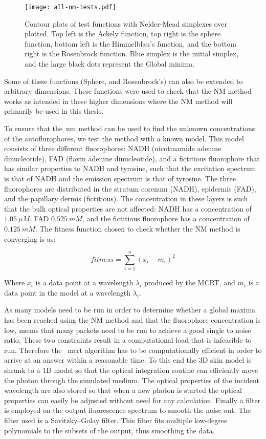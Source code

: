 \begin{figure}[!htbp]
    \centering
    \texttt{[image: all-nm-tests.pdf]}
    \caption{Contour plots of test functions with Nelder-Mead simplexes over plotted. Top left is the Ackely function, top right is the sphere function, bottom left is the Himmelblau's function, and the bottom right is the Rosenbrock function. Blue simplex is the initial simplex, and the large black dots represent the Global minima.}
    \label{fig:nmtest}
\end{figure}

Some of these functions (Sphere, and Rosenbrock's) can also be extended to arbitrary dimensions. These functions were used to check that the NM method works as intended in these higher dimensions where the NM method will primarily be used in this thesis.

To ensure that the~\gls*{nm} method can be used to find the unknown concentrations of the autoflurophores, we test the method with a known model.
This model consists of three different fluorophores: NADH (nicotinamide adenine dinucleotide), FAD (flavin adenine dinucleotide), and a fictitious fluorophore that has similar properties to NADH and tyrosine, such that the excitation spectrum is that of NADH and the emission spectrum is that of tyrosine.
The three fluorophores are distributed in the stratum corenum (NADH), epidermis (FAD), and the papillary dermis (fictitious).
The concentration in these layers is such that the bulk optical properties are not affected: NADH has a concentration of $1.05~\mu M$, FAD $0.525~m M$, and the fictitious fluorophore has a concentration of $0.125~mM$. %
The fitness function chosen to check whether the NM method is converging is as:

\begin{equation}
fitness = \sum\limits_{i=1}^{n}(x_i-m_i)^2
\end{equation}

Where $x_i$ is a data point at a wavelength $\lambda_i$ produced by the MCRT, and $m_i$ is a data point in the model at a wavelength $\lambda_i$.

As many models need to be run in order to determine whether a global maxima has been reached using the NM method and that the fluorophore concentration is low, means that many packets need to be run to achieve a good single to noise ratio.
These two constraints result in a computational load that is infeasible to run. 
Therefore the ~\gls*{mcrt} algorithm has to be computationally efficient in order to arrive at an answer within a reasonable time.
To this end the 3D skin model is shrunk to a 1D model so that the optical integration routine can efficiently move the photon through the simulated medium.
The optical properties of the incident wavelength are also stored so that when a new photon is started the optical properties can easily be adjusted without need for any calculation.
Finally a filter is employed on the output fluorescence spectrum to smooth the noise out.
The filter used is a Savitzky–Golay filter.
This filter fits multiple low-degree polynomials to the subsets of the output, thus smoothing the data. 


